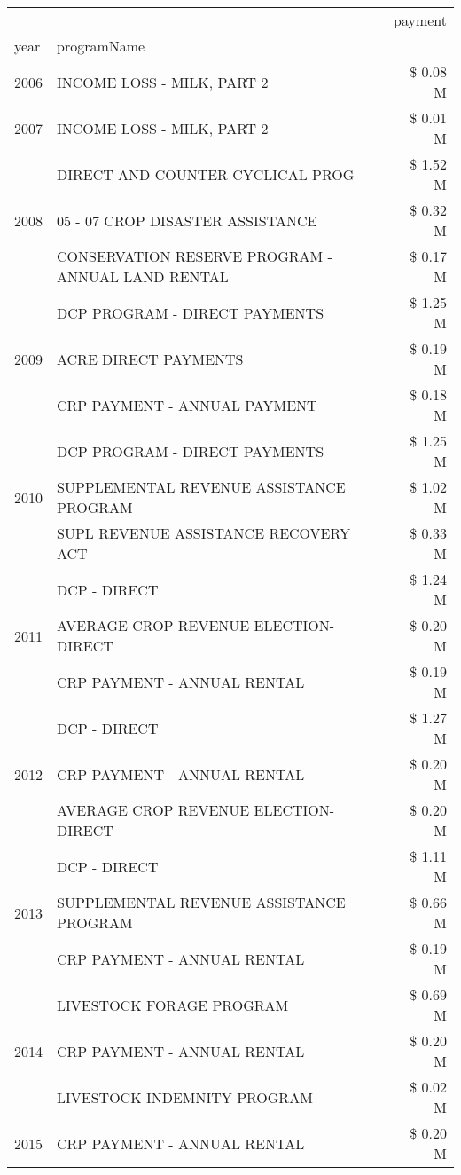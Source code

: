 \begin{tabular}{llr}
\toprule
 &  & payment \\
year & programName &  \\
\midrule
2006 & INCOME LOSS - MILK, PART 2 & \$ 0.08 M \\
\cline{1-3}
2007 & INCOME LOSS - MILK, PART 2 & \$ 0.01 M \\
\cline{1-3}
\multirow[t]{3}{*}{2008} & DIRECT AND COUNTER CYCLICAL PROG & \$ 1.52 M \\
 & 05 - 07 CROP DISASTER ASSISTANCE & \$ 0.32 M \\
 & CONSERVATION RESERVE PROGRAM - ANNUAL LAND RENTAL & \$ 0.17 M \\
\cline{1-3}
\multirow[t]{3}{*}{2009} & DCP PROGRAM - DIRECT PAYMENTS & \$ 1.25 M \\
 & ACRE DIRECT PAYMENTS & \$ 0.19 M \\
 & CRP PAYMENT - ANNUAL PAYMENT & \$ 0.18 M \\
\cline{1-3}
\multirow[t]{3}{*}{2010} & DCP PROGRAM - DIRECT PAYMENTS & \$ 1.25 M \\
 & SUPPLEMENTAL REVENUE ASSISTANCE PROGRAM & \$ 1.02 M \\
 & SUPL REVENUE ASSISTANCE RECOVERY ACT & \$ 0.33 M \\
\cline{1-3}
\multirow[t]{3}{*}{2011} & DCP - DIRECT & \$ 1.24 M \\
 & AVERAGE CROP REVENUE ELECTION-DIRECT & \$ 0.20 M \\
 & CRP PAYMENT - ANNUAL RENTAL & \$ 0.19 M \\
\cline{1-3}
\multirow[t]{3}{*}{2012} & DCP - DIRECT & \$ 1.27 M \\
 & CRP PAYMENT - ANNUAL RENTAL & \$ 0.20 M \\
 & AVERAGE CROP REVENUE ELECTION-DIRECT & \$ 0.20 M \\
\cline{1-3}
\multirow[t]{3}{*}{2013} & DCP - DIRECT & \$ 1.11 M \\
 & SUPPLEMENTAL REVENUE ASSISTANCE PROGRAM & \$ 0.66 M \\
 & CRP PAYMENT - ANNUAL RENTAL & \$ 0.19 M \\
\cline{1-3}
\multirow[t]{3}{*}{2014} & LIVESTOCK FORAGE PROGRAM & \$ 0.69 M \\
 & CRP PAYMENT - ANNUAL RENTAL & \$ 0.20 M \\
 & LIVESTOCK INDEMNITY PROGRAM & \$ 0.02 M \\
\cline{1-3}
\multirow[t]{3}{*}{2015} & CRP PAYMENT - ANNUAL RENTAL & \$ 0.20 M \\

\end{tabular}
